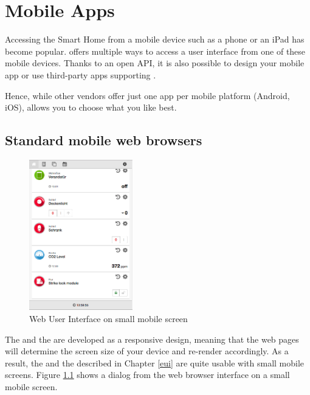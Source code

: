 \chapter{Mobile Apps}
\label{mobileapps}


Accessing the Smart Home from a mobile device such as a phone or an iPad has become popular. 
\zway offers multiple ways to access a user interface from one of these 
mobile devices. Thanks to an open API, it is also possible to design your mobile app or 
use third-party apps supporting \zway.

Hence, while other vendors offer just one app per mobile platform (Android, iOS), \zway 
allows you to choose what you like best.

\section{Standard mobile web browsers}

\begin{figure}
\begin{center}
\includegraphics[width=0.4\textwidth]{pngs/cap5/mobile1.png}
\caption{Web User Interface on small mobile screen}
\label{mobile1}
\end{center}
\end{figure}

The \zwshui and the \zweui are developed as a responsive design, meaning that the web 
pages will determine the screen size of your device and re-render accordingly.
As a result, the \zwshui and the \zweui described 
in Chapter \ref{eui} are quite usable with small mobile screens. Figure \ref{mobile1} 
shows a dialog from the web browser interface on a small mobile screen.

